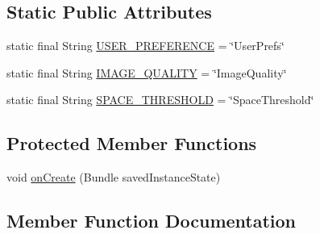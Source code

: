 \subsection*{Static Public Attributes}
\begin{DoxyCompactItemize}
\item 
static final String \hyperlink{classcourse_1_1examples_1_1spacesaver_1_1_main_activity_a62fba147272fa9f0399c82fdd08dbc82}{U\+S\+E\+R\+\_\+\+P\+R\+E\+F\+E\+R\+E\+N\+C\+E} = \char`\"{}User\+Prefs\char`\"{}
\item 
static final String \hyperlink{classcourse_1_1examples_1_1spacesaver_1_1_main_activity_a02332766acdcc44702cbfaee00c0b7ec}{I\+M\+A\+G\+E\+\_\+\+Q\+U\+A\+L\+I\+T\+Y} = \char`\"{}Image\+Quality\char`\"{}
\item 
static final String \hyperlink{classcourse_1_1examples_1_1spacesaver_1_1_main_activity_a73bec883ca93d8c9c0691b1233f08f38}{S\+P\+A\+C\+E\+\_\+\+T\+H\+R\+E\+S\+H\+O\+L\+D} = \char`\"{}Space\+Threshold\char`\"{}
\end{DoxyCompactItemize}
\subsection*{Protected Member Functions}
\begin{DoxyCompactItemize}
\item 
void \hyperlink{classcourse_1_1examples_1_1spacesaver_1_1_main_activity_a03e5171f1ff658442936a03ef4caf7a3}{on\+Create} (Bundle saved\+Instance\+State)
\end{DoxyCompactItemize}


\subsection{Member Function Documentation}
\hypertarget{classcourse_1_1examples_1_1spacesaver_1_1_main_activity_a03e5171f1ff658442936a03ef4caf7a3}{}
